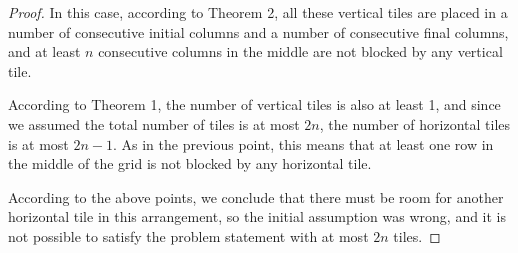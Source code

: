 \begin{solution}
\begin{proof}
In this case, according to Theorem 2, all these vertical tiles are placed in a number of consecutive initial columns and a number of consecutive final columns, and at least $n$ consecutive columns in the middle are not blocked by any vertical tile.

According to Theorem 1, the number of vertical tiles is also at least 1, and since we assumed the total number of tiles is at most $2n$, the number of horizontal tiles is at most $2n - 1$. As in the previous point, this means that at least one row in the middle of the grid is not blocked by any horizontal tile.

According to the above points, we conclude that there must be room for another horizontal tile in this arrangement, so the initial assumption was wrong, and it is not possible to satisfy the problem statement with at most $2n$ tiles.
\end{proof}

\end{solution}
